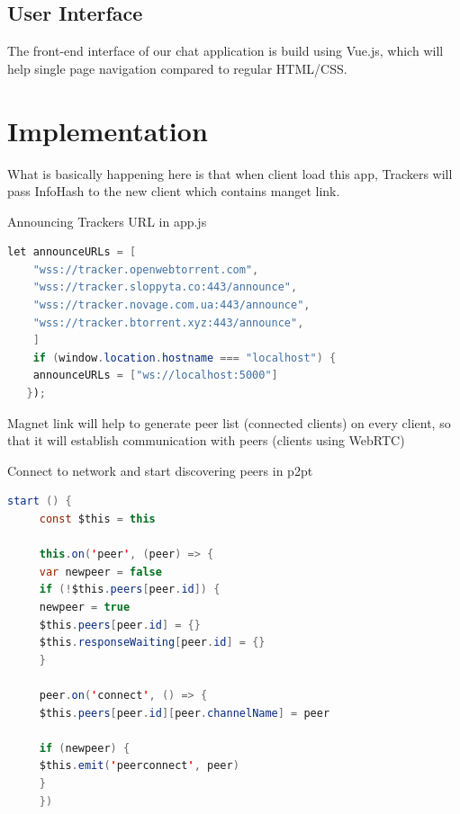 \documentclass{fisatproject}
\begin{document}
   \vspace{1cm}
  
 
    
    \vspace{1cm}
    \subsection{User Interface}
    The front-end interface of our chat application is build using Vue.js, which will help single page navigation compared to regular HTML/CSS.
    \newpage

\section{Implementation}
    What is basically happening here is that when client load this app, Trackers will pass InfoHash to the new client which contains manget link.
    
        \vspace{0.6cm}
Announcing Trackers URL in app.js  
	\begin{lstlisting}[language=java]
	let announceURLs = [
	"wss://tracker.openwebtorrent.com",
	"wss://tracker.sloppyta.co:443/announce",
	"wss://tracker.novage.com.ua:443/announce",
	"wss://tracker.btorrent.xyz:443/announce",
	]
	if (window.location.hostname === "localhost") {
	announceURLs = ["ws://localhost:5000"]
   });
   \end{lstlisting}
           \vspace{0.6cm}
   Magnet link will help to generate peer list (connected clients) on every client, so that it will establish communication with peers (clients using WebRTC)
   
   
              \vspace{0.6cm}
              Connect to network and start discovering peers in p2pt
	 \begin{lstlisting}[language=java]
	 start () {
	 const $this = this
	 
	 this.on('peer', (peer) => {
	 var newpeer = false
	 if (!$this.peers[peer.id]) {
	 newpeer = true
	 $this.peers[peer.id] = {}
	 $this.responseWaiting[peer.id] = {}
	 }
	 
	 peer.on('connect', () => {
	 $this.peers[peer.id][peer.channelName] = peer
	 
	 if (newpeer) {
	 $this.emit('peerconnect', peer)
	 }
	 })
	    \end{lstlisting}
        \vspace{0.6cm}
\end{document}
